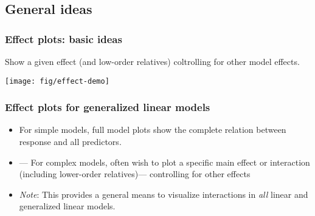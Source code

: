 \renewcommand{\FileName}{effplot}
\subsection{General ideas}
\begin{frame}
 \frametitle{Effect plots: basic ideas}
Show a given effect (and low-order relatives) coltrolling for other model effects.
\begin{center}
 \texttt{[image: fig/effect-demo]}
\end{center}
\end{frame}
 
\begin{frame}
  \frametitle{Effect plots for generalized linear models}
  \begin{itemize}
    \item For simple models, full model plots show the complete relation between response
	and all predictors.
	\item \citet{Fox:87}--- For complex models, often wish to plot a specific main effect or
	interaction (including lower-order relatives)--- controlling for other effects
	\item \emph{Note}: This provides a general means to visualize interactions in \emph{all} linear and generalized
	linear models.
  \end{itemize}
  
\end{frame}

